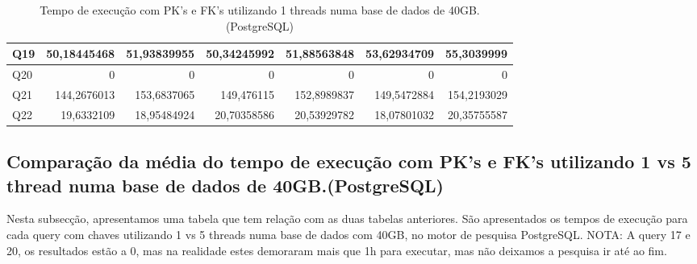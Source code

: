 \documentclass{article}
\begin{document}
\begin{table}[H]
{\begin{tabular}{|l|r|r|r|r|r|r|}
Q19&	50,18445468&	51,93839955	&50,34245992&	51,88563848	&53,62934709&	55,3039999\\ \hline
Q20&	0&	0	&0&	0	&0	&0\\ \hline
Q21&	144,2676013&	153,6837065&	149,476115	&152,8989837	&149,5472884&	154,2193029\\ \hline
Q22&	19,6332109&	18,95484924	&20,70358586	&20,53929782	&18,07801032&	20,35755587\\ \hline
    \end{tabular}}
    \caption{Tempo de execução com PK's e FK's utilizando 1 threads numa base de dados de 40GB.(PostgreSQL)}
    \label{tab:BC_Table6}
  \end{table}

\clearpage
  \subsection{Comparação da média do tempo de execução com PK's e FK's utilizando 1 vs 5 thread numa base de dados de 40GB.(PostgreSQL)}
\texttt{}\par Nesta subsecção, apresentamos uma tabela que tem relação com as duas tabelas anteriores. São apresentados os tempos de execução para cada query com chaves utilizando 1 vs 5 threads numa base de dados com 40GB, no motor de pesquisa PostgreSQL.
NOTA: A query 17 e 20, os resultados estão a 0, mas na realidade estes demoraram mais que 1h para executar, mas não deixamos a pesquisa ir até ao fim.
\end{document}
